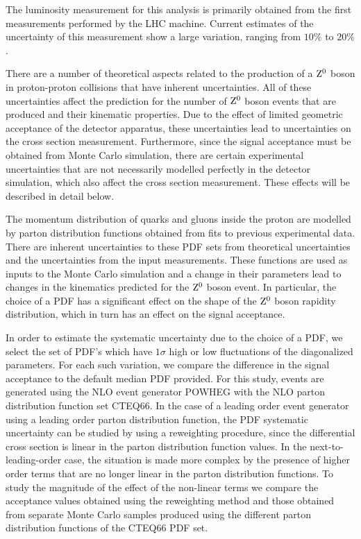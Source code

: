 \documentclass{cmspaper}
\begin{document}
The luminosity measurement for this analysis is primarily obtained from the first measurements performed by the LHC machine. Current estimates of the uncertainty of this measurement show a large variation, ranging from $10\%$ to $20\%$.

\label{sec:pdfSystematic}
There are a number of theoretical aspects related to the production of a $\mathrm{Z^0}$ boson in proton-proton collisions that have inherent uncertainties. All of these uncertainties affect the prediction for the number of $\mathrm{Z^0}$ boson events that are produced and their kinematic properties. Due to the effect of limited geometric acceptance of the detector apparatus, these uncertainties lead to uncertainties on the cross section measurement. Furthermore, since the signal acceptance must be obtained from Monte Carlo simulation, there are certain experimental uncertainties that are not necessarily modelled perfectly in the detector simulation, which also affect the cross section measurement. These effects will be described in detail below.

The momentum distribution of quarks and gluons inside the proton are modelled by parton distribution functions obtained from fits to previous experimental data. There are inherent uncertainties to these PDF sets from theoretical uncertainties and the uncertainties from the input measurements. These functions are used as inputs to the Monte Carlo simulation and a change in their parameters lead to changes in the kinematics predicted for the $\mathrm{Z^0}$ boson event. In particular, the choice of a PDF has a significant effect on the shape of the $\mathrm{Z^0}$ boson rapidity distribution, which in turn has an effect on the signal acceptance. 

In order to estimate the systematic uncertainty due to the choice of a PDF, we select the set of PDF's which have $1\sigma$ high or low fluctuations of the diagonalized parameters. For each such variation, we compare the difference in the signal acceptance to the default median PDF provided. For this study, events are generated using the NLO event generator POWHEG with the NLO parton distribution function set CTEQ66. In the case of a leading order event generator using a leading order parton distribution function, the PDF systematic uncertainty can be studied by using a reweighting procedure, since the differential cross section is linear in the parton distribution function values. In the next-to-leading-order case, the situation is made more complex by the presence of higher order terms that are no longer linear in the parton distribution functions. To study the magnitude of the effect of the non-linear terms we compare the acceptance values obtained using the reweighting method and those obtained from separate Monte Carlo samples produced using the different parton distribution functions of the CTEQ66 PDF set. 
\end{document}
